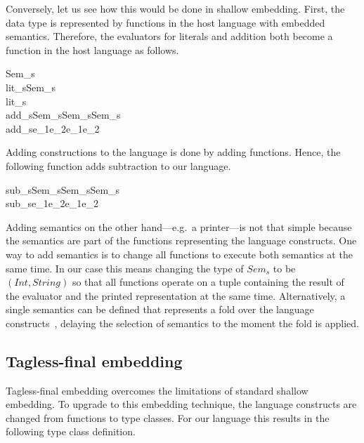 \documentclass[runningheads]{llncs}
\newcommand{\Conid}[1]{\mathit{#1}}
\newcommand{\Varid}[1]{\mathit{#1}}
\def\resethooks{%
  \global\let\SaveRestoreHook\empty
  \global\let\ColumnHook\empty}
\newlength{\blanklineskip}
\let\hspre\empty
\let\hspost\empty
\begin{document}
Conversely, let us see how this would be done in shallow embedding.
First, the data type is represented by functions in the host language with embedded semantics.
Therefore, the evaluators for literals and addition both become a function in the host language as follows.

\begin{hscode}\SaveRestoreHook
\column{B}{@{}>{\hspre}l<{\hspost}@{}}%
\column{E}{@{}>{\hspre}l<{\hspost}@{}}%
\>[B]{}\;Sem_s\mathrel{=}\Conid{Int}{}\<[E]%
\\[\blanklineskip]%
\>[B]{}lit_s\mathbin{::}\Conid{Int}\to Sem_s{}\<[E]%
\\
\>[B]{}lit_s\;\Varid{i}\mathrel{=}\Varid{i}{}\<[E]%
\\[\blanklineskip]%
\>[B]{}add_s\mathbin{::}Sem_s\to Sem_s\to Sem_s{}\<[E]%
\\
\>[B]{}add_s\;e_1\;e_2\mathrel{=}e_1\mathbin{+}e_2{}\<[E]%
\ColumnHook
\end{hscode}\resethooks

Adding constructions to the language is done by adding functions.
Hence, the following function adds subtraction to our language.

\begin{hscode}\SaveRestoreHook
\column{B}{@{}>{\hspre}l<{\hspost}@{}}%
\column{E}{@{}>{\hspre}l<{\hspost}@{}}%
\>[B]{}sub_s\mathbin{::}Sem_s\to Sem_s\to Sem_s{}\<[E]%
\\
\>[B]{}sub_s\;e_1\;e_2\mathrel{=}e_1\mathbin{-}e_2{}\<[E]%
\ColumnHook
\end{hscode}\resethooks

Adding semantics on the other hand---e.g.\ a printer---is not that simple because the semantics are part of the functions representing the language constructs.
One way to add semantics is to change all functions to execute both semantics at the same time.
In our case this means changing the type of \ensuremath{Sem_s} to be \ensuremath{(\Conid{Int},\Conid{String})} so that all functions operate on a tuple containing the result of the evaluator and the printed representation at the same time. %
Alternatively, a single semantics can be defined that represents a fold over the language constructs~\cite{gibbons_folding_2014}, delaying the selection of semantics to the moment the fold is applied.

\subsection{Tagless-final embedding}\label{sec:tagless-final}
Tagless-final embedding overcomes the limitations of standard shallow embedding.
To upgrade to this embedding technique, the language constructs are changed from functions to type classes.
For our language this results in the following type class definition.
\end{document}
